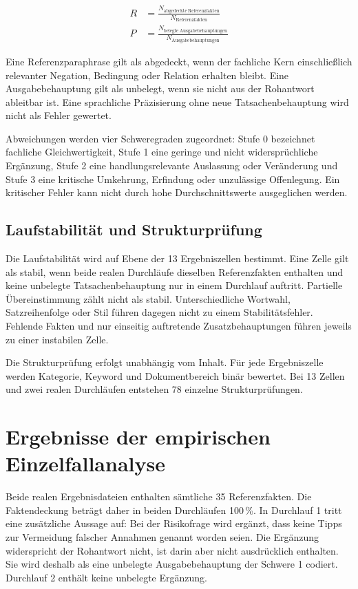 \documentclass[
  10pt,
  ngerman,
  a4paper,
  toc=graduated,
  numbers=noenddot,
  headings=standardclasses,
  nonumberlist
]{scrartcl}
\newcommand{\pct}[1]{#1\,\%}
\begin{document}
\begin{align}
R &= \frac{N_{\mathrm{abgedeckte\ Referenzfakten}}}{N_{\mathrm{Referenzfakten}}} \\
P &= \frac{N_{\mathrm{belegte\ Ausgabebehauptungen}}}{N_{\mathrm{Ausgabebehauptungen}}}
\end{align}

Eine Referenzparaphrase gilt als abgedeckt, wenn der fachliche Kern einschließlich relevanter Negation, Bedingung oder Relation erhalten bleibt. Eine Ausgabebehauptung gilt als unbelegt, wenn sie nicht aus der Rohantwort ableitbar ist. Eine sprachliche Präzisierung ohne neue Tatsachenbehauptung wird nicht als Fehler gewertet.

Abweichungen werden vier Schweregraden zugeordnet: Stufe 0 bezeichnet fachliche Gleichwertigkeit, Stufe 1 eine geringe und nicht widersprüchliche Ergänzung, Stufe 2 eine handlungsrelevante Auslassung oder Veränderung und Stufe 3 eine kritische Umkehrung, Erfindung oder unzulässige Offenlegung. Ein kritischer Fehler kann nicht durch hohe Durchschnittswerte ausgeglichen werden.

\subsection{Laufstabilität und Strukturprüfung}

Die Laufstabilität wird auf Ebene der 13 Ergebniszellen bestimmt. Eine Zelle gilt als stabil, wenn beide realen Durchläufe dieselben Referenzfakten enthalten und keine unbelegte Tatsachenbehauptung nur in einem Durchlauf auftritt. Partielle Übereinstimmung zählt nicht als stabil. Unterschiedliche Wortwahl, Satzreihenfolge oder Stil führen dagegen nicht zu einem Stabilitätsfehler. Fehlende Fakten und nur einseitig auftretende Zusatzbehauptungen führen jeweils zu einer instabilen Zelle.

Die Strukturprüfung erfolgt unabhängig vom Inhalt. Für jede Ergebniszelle werden Kategorie, Keyword und Dokumentbereich binär bewertet. Bei 13 Zellen und zwei realen Durchläufen entstehen 78 einzelne Strukturprüfungen.

\section{Ergebnisse der empirischen Einzelfallanalyse}

Beide realen Ergebnisdateien enthalten sämtliche 35 Referenzfakten. Die Faktendeckung beträgt daher in beiden Durchläufen \pct{100}. In Durchlauf 1 tritt eine zusätzliche Aussage auf: Bei der Risikofrage wird ergänzt, dass keine Tipps zur Vermeidung falscher Annahmen genannt worden seien. Die Ergänzung widerspricht der Rohantwort nicht, ist darin aber nicht ausdrücklich enthalten. Sie wird deshalb als eine unbelegte Ausgabebehauptung der Schwere 1 codiert. Durchlauf 2 enthält keine unbelegte Ergänzung.
\end{document}
